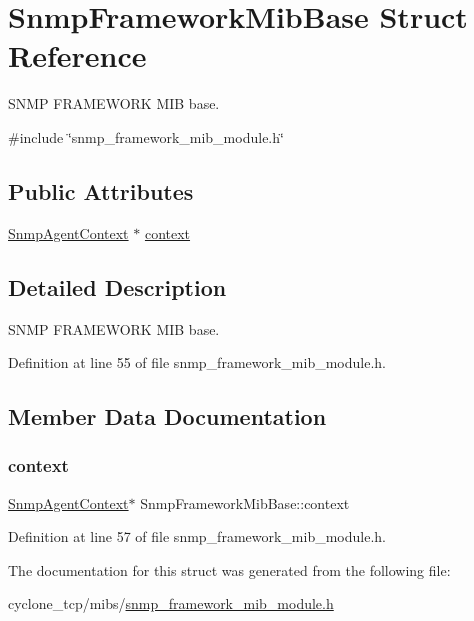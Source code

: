 \hypertarget{structSnmpFrameworkMibBase}{}\section{Snmp\+Framework\+Mib\+Base Struct Reference}
\label{structSnmpFrameworkMibBase}


S\+N\+MP F\+R\+A\+M\+E\+W\+O\+RK M\+IB base.  




{\ttfamily \#include \char`\"{}snmp\+\_\+framework\+\_\+mib\+\_\+module.\+h\char`\"{}}

\subsection*{Public Attributes}
\begin{DoxyCompactItemize}
\item 
\hyperlink{snmp__agent_8h_a4c68afef83114acf80065b64191bfdac}{Snmp\+Agent\+Context} $\ast$ \hyperlink{structSnmpFrameworkMibBase_a35b88432c02ff2c1728449a892a4255b}{context}
\end{DoxyCompactItemize}


\subsection{Detailed Description}
S\+N\+MP F\+R\+A\+M\+E\+W\+O\+RK M\+IB base. 

Definition at line 55 of file snmp\+\_\+framework\+\_\+mib\+\_\+module.\+h.



\subsection{Member Data Documentation}
\mbox{\label{structSnmpFrameworkMibBase_a35b88432c02ff2c1728449a892a4255b}} 
\subsubsection{\texorpdfstring{context}{context}}
{\footnotesize\ttfamily \hyperlink{snmp__agent_8h_a4c68afef83114acf80065b64191bfdac}{Snmp\+Agent\+Context}$\ast$ Snmp\+Framework\+Mib\+Base\+::context}



Definition at line 57 of file snmp\+\_\+framework\+\_\+mib\+\_\+module.\+h.



The documentation for this struct was generated from the following file\+:\begin{DoxyCompactItemize}
\item 
cyclone\+\_\+tcp/mibs/\hyperlink{snmp__framework__mib__module_8h}{snmp\+\_\+framework\+\_\+mib\+\_\+module.\+h}\end{DoxyCompactItemize}
